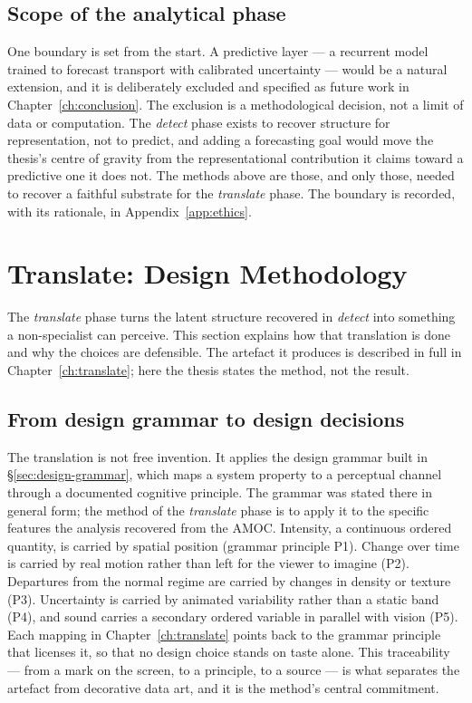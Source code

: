 \subsection{Scope of the analytical phase}
\label{subsec:detect-scope}

One boundary is set from the start. A predictive layer --- a recurrent model trained to forecast transport with calibrated uncertainty --- would be a natural extension, and it is deliberately excluded and specified as future work in Chapter~\ref{ch:conclusion}. The exclusion is a methodological decision, not a limit of data or computation. The \emph{detect} phase exists to recover structure for representation, not to predict, and adding a forecasting goal would move the thesis's centre of gravity from the representational contribution it claims toward a predictive one it does not. The methods above are those, and only those, needed to recover a faithful substrate for the \emph{translate} phase. The boundary is recorded, with its rationale, in Appendix~\ref{app:ethics}.

\section{Translate: Design Methodology}
\label{sec:translate-methodology}
 
The \emph{translate} phase turns the latent structure recovered in \emph{detect} into something a non-specialist can perceive. This section explains how that translation is done and why the choices are defensible. The artefact it produces is described in full in Chapter~\ref{ch:translate}; here the thesis states the method, not the result.
 
\subsection{From design grammar to design decisions}
\label{subsec:translate-grammar}
 
The translation is not free invention. It applies the design grammar built in \S\ref{sec:design-grammar}, which maps a system property to a perceptual channel through a documented cognitive principle. The grammar was stated there in general form; the method of the \emph{translate} phase is to apply it to the specific features the analysis recovered from the AMOC. Intensity, a continuous ordered quantity, is carried by spatial position (grammar principle P1). Change over time is carried by real motion rather than left for the viewer to imagine (P2). Departures from the normal regime are carried by changes in density or texture (P3). Uncertainty is carried by animated variability rather than a static band (P4), and sound carries a secondary ordered variable in parallel with vision (P5). Each mapping in Chapter~\ref{ch:translate} points back to the grammar principle that licenses it, so that no design choice stands on taste alone. This traceability --- from a mark on the screen, to a principle, to a source --- is what separates the artefact from decorative data art, and it is the method's central commitment.
 
